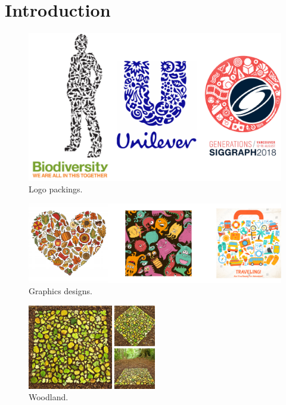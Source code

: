 
\chapter{Introduction}

\begin{figure}
\centering
\includegraphics[width=1.0\textwidth]{figures/intro/logos.pdf} 
\caption{\label{fig_logo_packings} 
Logo packings. }
\end{figure}

\begin{figure}
\centering
\includegraphics[width=1.0\textwidth]{figures/intro/graphics_designs.pdf} 
\caption{\label{fig_graphics_designs} 
Graphics designs. }
\end{figure}



\begin{figure}
\centering
\includegraphics[width=0.5\textwidth]{figures/intro/woodland.jpg} 
\caption{\label{fig_woodland} 
Woodland. }
\end{figure}

